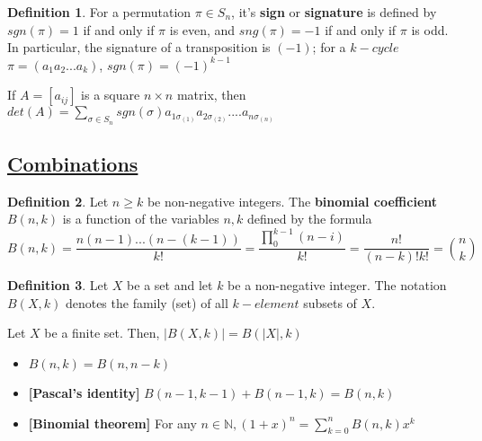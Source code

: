 \documentclass{article}
\theoremstyle{definition}
\newtheorem*{defi}{Definition}
\theoremstyle{definition}
\newenvironment{manualprop}[1]{%
  \renewcommand\themanualpropinner{#1}%
  \manualpropinner
}{\endmanualpropinner}
\newenvironment{manualtheorem}[1]{%
  \renewcommand\themanualtheoreminner{#1}%
  \manualtheoreminner
}{\endmanualtheoreminner}
\theoremstyle{named}
\begin{document}
\begin{defi}
For a permutation $\pi \in S_n$, it's \textbf{sign} or \textbf{signature} is defined by $sgn(\pi) = 1$ if and only if $\pi$ is even, and $sng(\pi) = -1$ if and only if $\pi$ is odd. In particular, the signature of a transposition is $(-1)$; for a $k-cycle$ $\pi = (a_1 a_2 ... a_k)$, $sgn(\pi) = (-1)^{k-1}$ 
\end{defi}

\begin{manualtheorem}{4 (Determinant Formula)}
    If $A = [a_{ij}]$ is a square $n \times n$ matrix, then $det(A) = \sum\limits_{\sigma \in S_{n} } sgn(\sigma) a_{1\sigma_{(1)}} a_{2\sigma_{(2)}} .... a_{n\sigma_{(n)}}$
\end{manualtheorem}




\subsection{\underline{Combinations}}
\begin{defi}
    Let $n \geq k$ be non-negative integers. The \textbf{binomial coefficient} $B(n, k)$ is a function of the variables $n, k$ defined by the formula \[
    B(n, k) = \frac{n(n-1)...(n-(k-1))}{k!} =\frac{\prod_{0}^{k-1} (n-i)}{k!} = \frac{n!}{(n-k)!k!} = \binom{n}{k}
    \]
\end{defi}

\begin{defi}
    Let $X$ be a set and let $k$ be a non-negative integer. The notation $B(X, k)$ denotes the family (set) of all $k-element$ subsets of $X$.
\end{defi}

\begin{manualprop}{26}
    Let $X$ be a finite set. Then, $|B(X, k)| = B(|X|, k)$
\end{manualprop}

\begin{manualprop}{27}
    \begin{itemize}
        \item $B(n, k) = B(n, n-k)$
        \item \textbf{[Pascal's identity]} $B(n-1, k-1) + B(n-1, k) = B(n, k)$
        \item \textbf{[Binomial theorem]} For any $n \in \mathbb{N}, (1+x)^n = \sum_{k=0}^{n} B(n, k)x^k$
    \end{itemize}
\end{manualprop}
\end{document}
